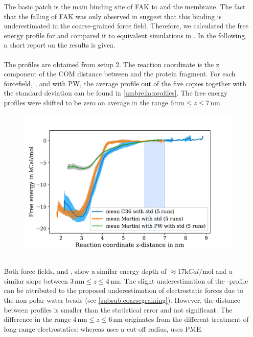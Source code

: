 \label{results:umbrella}
The basic patch is the main binding site of FAK to \pip{} and the membrane. The fact that the falling of FAK was only observed in \martini{} suggest that this binding is underestimated in the coarse-grained force field. Therefore, we calculated the free energy profile for \martini{} and compared it to equivalent simulations in \charmm{}. In the following, a short report on the results is given.\\
\\
The profiles are obtained from setup 2. The reaction coordinate is the z component of the COM distance between \pip{} and the protein fragment. For each forcefield, \charmm{}, \martini{} and \martini{} with PW, the average profile out of the five copies together with the standard deviation can be found in \autoref{umbrella:profiles}. The free energy profiles were shifted to be zero on average in the range $6\,\si{\nano\metre} \le z \le 7\,\si{\nano\metre}$.\\
%
%
%
\begin{figure}[hb]
	\centering
	\includegraphics[width=.8\textwidth]{figures/results/umbrella}
	\label{umbrella:profiles}
\end{figure}
%
%
%
\\
Both force fields, \charmm{} and \martini{}, show a similar energy depth of $\approx 17 \si{\kilo Cal/\mole}$ and a similar slope between $3\,\si{\nano\metre} \le z \le 4\,\si{\nano\metre}$. The slight underestimation of the \martini{}-profile can be attributed to the proposed underestimation of electrostatic forces due to the non-polar water beads (see \autoref{subsub:coarsegraining}). However, the distance between profiles is smaller than the statistical error and not significant. The difference in the range $4\,\si{\nano\metre} \le z \le 6\,\si{\nano\metre}$ originates from the different treatment of long-range electrostatics: whereas \martini{} uses a cut-off radius, \charmm{} uses PME.\\

